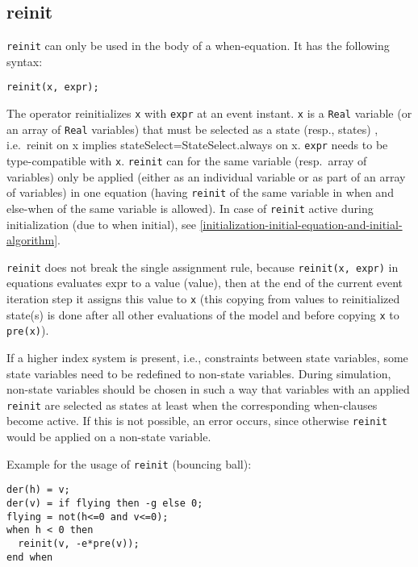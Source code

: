 \subsection{reinit}

\lstinline!reinit! can only be used in the body of a when-equation.  It has the following syntax:
\begin{lstlisting}[language=modelica]
reinit(x, expr);
\end{lstlisting}

The operator reinitializes \lstinline!x! with \lstinline!expr! at an event instant. \lstinline!x! is a
\lstinline!Real!
variable (or an array of \lstinline!Real! variables) that must be selected as a
state (resp., states) , i.e.\ reinit on x implies
stateSelect=StateSelect.always on x. \lstinline!expr! needs to be type-compatible
with \lstinline!x!. \lstinline!reinit! can for the same variable (resp.\ array of
variables) only be applied (either as an individual variable or as part
of an array of variables) in one equation (having \lstinline!reinit! of the same
variable in when and else-when of the same variable is allowed). In case
of \lstinline!reinit! active during initialization (due to when initial), see
\autoref{initialization-initial-equation-and-initial-algorithm}.

\lstinline!reinit! does not break the single assignment rule, because \lstinline!reinit(x, expr)! in equations evaluates expr to a value (value),
then at the end of the current event iteration step it assigns this value to \lstinline!x! (this copying from values to reinitialized state(s) is
done after all other evaluations of the model and before copying \lstinline!x! to \lstinline!pre(x)!).

\begin{example}
If a higher index system is present, i.e., constraints between
state variables, some state variables need to be redefined to non-state
variables. During simulation, non-state variables should be chosen in
such a way that variables with an applied \lstinline!reinit! are
selected as states at least when the corresponding when-clauses become
active. If this is not possible, an error occurs, since otherwise
\lstinline!reinit! would be applied on a non-state variable.

Example for the usage of \lstinline!reinit! (bouncing ball):
\begin{lstlisting}[language=modelica]
der(h) = v;
der(v) = if flying then -g else 0;
flying = not(h<=0 and v<=0);
when h < 0 then
  reinit(v, -e*pre(v));
end when
\end{lstlisting}
\end{example}

